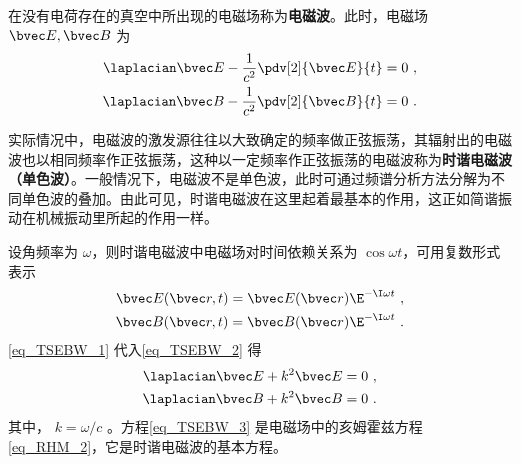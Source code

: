 
在没有电荷存在的真空中所出现的电磁场称为\textbf{电磁波}。此时，电磁场 $\bvec E,\bvec B$ 为
\begin{equation}\label{eq_TSEBW_2}
\begin{aligned}
\laplacian\bvec E-\frac{1}{c^2}\pdv[2]{\bvec E}{t}=0~,\\
\laplacian\bvec B-\frac{1}{c^2}\pdv[2]{\bvec B}{t}=0~.
\end{aligned}
\end{equation}

实际情况中，电磁波的激发源往往以大致确定的频率做正弦振荡，其辐射出的电磁波也以相同频率作正弦振荡，这种以一定频率作正弦振荡的电磁波称为\textbf{时谐电磁波（单色波）}。一般情况下，电磁波不是单色波，此时可通过频谱分析方法分解为不同单色波的叠加。由此可见，时谐电磁波在这里起着最基本的作用，这正如简谐振动在机械振动里所起的作用一样。

设角频率为 $\omega$，则时谐电磁波中电磁场对时间依赖关系为 $\cos\omega t$，可用复数形式表示
\begin{equation}\label{eq_TSEBW_1}
\begin{aligned}
\bvec E(\bvec r,t)=\bvec E(\bvec r)\E^{-\I\omega t}~,\\
\bvec B(\bvec r,t)=\bvec B(\bvec r)\E^{-\I\omega t}~.
\end{aligned}
\end{equation}
\autoref{eq_TSEBW_1} 代入\autoref{eq_TSEBW_2} 得
\begin{equation}\label{eq_TSEBW_3}
\begin{aligned}
\laplacian\bvec E+k^2\bvec E=0~,\\
\laplacian\bvec B+k^2\bvec B=0~.
\end{aligned}
\end{equation}
其中， $k=\omega/c$ 。方程\autoref{eq_TSEBW_3} 是电磁场中的亥姆霍兹方程\autoref{eq_RHM_2}，它是时谐电磁波的基本方程。
